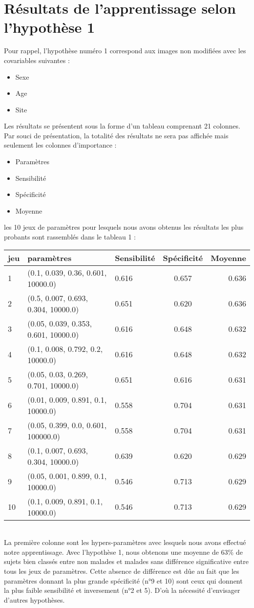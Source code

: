 \section{Résultats de l'apprentissage selon l'hypothèse 1}

Pour rappel, l'hypothèse numéro 1 correspond aux images non modifiées avec les covariables suivantes : 
\begin{itemize}
	\item Sexe
	\item Age
	\item Site
\end{itemize}
Les résultats se présentent sous la forme d'un tableau comprenant 21 colonnes. Par souci de présentation, la totalité des résultats ne sera pas affichée mais seulement les colonnes d'importance :
\begin{itemize}
\item Paramètres
\item Sensibilité
\item Spécificité
\item Moyenne	
\end{itemize}
les 10 jeux de paramètres pour lesquels nous avons obtenus les résultats les plus probants sont rassemblés dans le tableau 1 : 

\begin{tabular}{|l|l|l|c|r}
	\hline
	jeu & paramètres & Sensibilité & Spécificité & Moyenne \\
	\hline
	1 & (0.1, 0.039, 0.36, 0.601, 10000.0) & 0.616 & 0.657 & 0.636 \\
	2 & (0.5, 0.007, 0.693, 0.304, 10000.0) & 0.651 & 0.620 & 0.636 \\
	3 & (0.05, 0.039, 0.353, 0.601, 10000.0) & 0.616 & 0.648 & 0.632 \\
	4 & (0.1, 0.008, 0.792, 0.2, 10000.0) &	0.616 & 0.648 &	0.632 \\
	5 & (0.05, 0.03, 0.269, 0.701, 10000.0) & 0.651 & 0.616 & 0.631 \\
	6 & (0.01, 0.009, 0.891, 0.1, 10000.0) & 0.558 & 0.704 & 0.631 \\
	7 & (0.05, 0.399, 0.0, 0.601, 100000.0) & 0.558 & 0.704 & 0.631 \\
	8 & (0.1, 0.007, 0.693, 0.304, 10000.0) & 0.639 & 0.620 & 0.629 \\
	9 & (0.05, 0.001, 0.899, 0.1, 10000.0) & 0.546 & 0.713 & 0.629 \\
	10 & (0.1, 0.009, 0.891, 0.1, 10000.0) & 0.546 & 0.713 & 0.629 \\
	\hline
	
\end{tabular}
\\
La première colonne sont les hypers-paramètres avec lesquels nous avons effectué notre apprentissage. 
Avec l'hypothèse 1, nous obtenons une moyenne de 63\% de sujets bien classés entre non malades et malades sans différence significative entre tous les jeux de paramètres. Cette absence de différence est dûe au fait que les paramètres donnant la plus grande spécificité (n°9 et 10) sont ceux qui donnent la plus faible sensibilité et inversement (n°2 et 5). D'où la nécessité d'envisager d'autres hypothèses. 